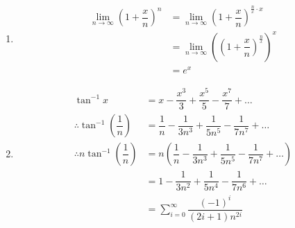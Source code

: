 \documentclass[fleqn, a4paper, 12pt, oneside]{amsart}
\theoremstyle{definition}
\theoremstyle{theorem}
\begin{document}
\begin{solution}
	\begin{enumerate}[leftmargin=*]
		\item 
			\begin{align*}
				\lim\limits_{n \to \infty} \left( 1 + \dfrac{x}{n} \right)^n &= \lim\limits_{n \to \infty} \left( 1 + \dfrac{x}{n} \right)^{\frac{n}{x} \cdot x}\\
				&= \lim\limits_{n \to \infty} \left( \left( 1 + \dfrac{x}{n} \right)^{\frac{n}{x}} \right)^x\\
				&= e^x
			\end{align*}
		\item
			\begin{align*}
				\tan^{-1} x &= x - \dfrac{x^3}{3} + \dfrac{x^5}{5} - \dfrac{x^7}{7} + \dots\\
				\therefore \tan^{-1} \left( \dfrac{1}{n} \right) &= \dfrac{1}{n} - \dfrac{1}{3 n^3} + \dfrac{1}{5 n^5} - \dfrac{1}{7 n^7} + \dots\\
				\therefore n \tan^{-1} \left( \dfrac{1}{n} \right) &= n \left( \dfrac{1}{n} - \dfrac{1}{3 n^3} + \dfrac{1}{5 n^5} - \dfrac{1}{7 n^7} + \dots \right)\\
				&= 1 - \dfrac{1}{3 n^2} + \dfrac{1}{5 n^4} - \dfrac{1}{7 n^6} + \dots\\
				&= \sum\limits_{i = 0}^{\infty} \dfrac{(-1)^i}{(2 i + 1) n^{2 i}}
			\end{align*}
	\end{enumerate}
\end{solution}
\end{document}
